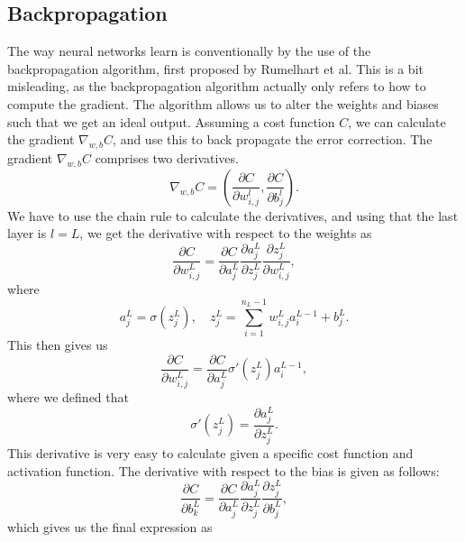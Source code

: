 \subsection*{Backpropagation}
The way neural networks learn is conventionally by the use of the backpropagation algorithm, first proposed by 
Rumelhart et al\cite{backprop}. This is a bit misleading, as the backpropagation algorithm actually only refers 
to how to compute the gradient\cite{Goodfellow-et-al-2016}. The algorithm allows us to alter the weights and 
biases such that we get an ideal output. Assuming a cost function $C$, we can calculate the gradient $\nabla_{w, b}C$,
and use this to back propagate the error correction. The gradient $\nabla_{w, b}C$ comprises two derivatives.
\begin{equation*}
    \nabla_{w, b}C = \left(\frac{\partial C}{\partial w_{i,j}^l}, \frac{\partial C}{\partial b_j^l}\right).
\end{equation*}
 We have to use the chain rule to calculate the derivatives, and using that the last layer is $l=L$, we get the derivative with respect to the weights as 
\begin{equation*}
    \frac{\partial C}{\partial w_{i,j}^L} = \frac{\partial C}{\partial a_j^L}\frac{\partial a_j^L}{\partial z_j^L}\frac{\partial z_j^L}{\partial w_{i,j}^L},
\end{equation*}
where 
\begin{equation*}
    a_j^L = \sigma(z_j^L), \quad z_j^L = \sum_{i=1}^{n_L-1} w_{i,j}^La_i^{L-1} + b_j^L.
\end{equation*}
This then gives us 
\begin{equation*}
    \frac{\partial C}{\partial w_{i,j}^L} = \frac{\partial C}{\partial a_j^L}\sigma'(z_j^L)a_i^{L-1},
\end{equation*}
where we defined that 
\begin{equation}\label{eq:sigma_der}
    \sigma'(z_j^L) = \frac{\partial a_j^L}{\partial z_j^L}.
\end{equation}
This derivative is very easy to calculate given a specific cost function and activation function. The derivative with respect to the bias is given as follows:
\begin{equation*}
    \frac{\partial C}{\partial b_k^L} = \frac{\partial C}{\partial a_j^L}\frac{\partial a_j^L}{\partial z_j^L}\frac{\partial z_j^L}{\partial b_{j}^L},
\end{equation*}
which gives us the final expression as 
